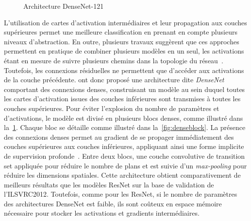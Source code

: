 \begin{figure}[t]
  \resizebox{\textwidth}{!}{
    
  }
  \caption{Architecture DenseNet-121~\cite{huang_densely_2017}}
  \label{fig:densenet}
\end{figure}


L'utilisation de cartes d'activation intermédiaires et leur propagation aux couches supérieures permet une meilleure classification en prenant en compte plusieurs niveaux d'abstraction. En outre, plusieurs travaux suggèrent que ces approches permettent en pratique de combiner plusieurs modèles en un seul, les activations étant en mesure de suivre plusieurs chemins dans la topologie du réseau~\cite{veit_residual_2016-1,huang_deep_2016-1}. Toutefois, les connexions résiduelles ne permettent que d'accéder aux activations de la couche précédente. \citet{huang_densely_2017} ont donc proposé une architecture dite \emph{DenseNet} comportant des connexions denses, construisant un modèle au sein duquel toutes les cartes d'activation issues des couches inférieures sont transmises à toutes les couches supérieures. Pour éviter l'explosion du nombre de paramètres et d'activations, le modèle est divisé en plusieurs blocs denses, comme illustré dans la~\cref{fig:densenet}. Chaque bloc se détaille comme illustré dans la~\cref{fig:denseblock}. La présence des connexions denses permet au gradient de se propager immédiatement des couches supérieures aux couches inférieures, appliquant ainsi une forme implicite de supervision profonde~\cite{lee_deeply-supervised_2015}. Entre deux blocs, une couche convolutive de transition set appliquée pour réduire le nombre de plans et est suivie d'un \emph{max-pooling} pour réduire les dimensions spatiales. Cette architecture obtient comparativement de meilleurs résultats que les modèles ResNet sur la base de validation de l'\gls{ILSVRC}2012. Toutefois, comme pour les ResNet, si le nombre de paramètres des architectures DenseNet est faible, ils sont coûteux en espace mémoire nécessaire pour stocker les activations et gradients intermédiaires.

